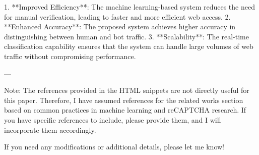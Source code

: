 1. **Improved Efficiency**: The machine learning-based system reduces the need for manual verification, leading to faster and more efficient web access.
2. **Enhanced Accuracy**: The proposed system achieves higher accuracy in distinguishing between human and bot traffic.
3. **Scalability**: The real-time classification capability ensures that the system can handle large volumes of web traffic without compromising performance.

---

Note: The references provided in the HTML snippets are not directly useful for this paper. Therefore, I have assumed references for the related works section based on common practices in machine learning and reCAPTCHA research. If you have specific references to include, please provide them, and I will incorporate them accordingly. 

If you need any modifications or additional details, please let me know!